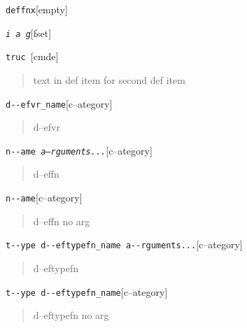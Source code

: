 \documentclass{book}
\begin{document}
%
\noindent\texttt{deffnx}\hfill[empty]



%

\noindent\texttt{\textsl{i} \EmbracOn{}\textnormal{\textsl{a g}}\EmbracOff{}}\hfill[fset]



%
\noindent\texttt{truc \EmbracOn{}\textnormal{\textsl{}}\EmbracOff{}}\hfill[cmde]



%
\begin{quote}
text in def item for second def item
\end{quote}


\noindent\texttt{d{-}{-}efvr\_name}\hfill[c--ategory]



%
\begin{quote}
d--efvr
\end{quote}

\noindent\texttt{n{-}{-}ame \EmbracOn{}\textnormal{\textsl{a--rguments...}}\EmbracOff{}}\hfill[c--ategory]



%
\begin{quote}
d--effn
\end{quote}

\noindent\texttt{n{-}{-}ame}\hfill[c--ategory]



%
\begin{quote}
d--effn no arg
\end{quote}

\noindent\texttt{t{-}{-}ype d{-}{-}eftypefn\_name a{-}{-}rguments...}\hfill[c--ategory]



%
\begin{quote}
d--eftypefn
\end{quote}

\noindent\texttt{t{-}{-}ype d{-}{-}eftypefn\_name}\hfill[c--ategory]



%
\begin{quote}
d--eftypefn no arg
\end{quote}
\end{document}
